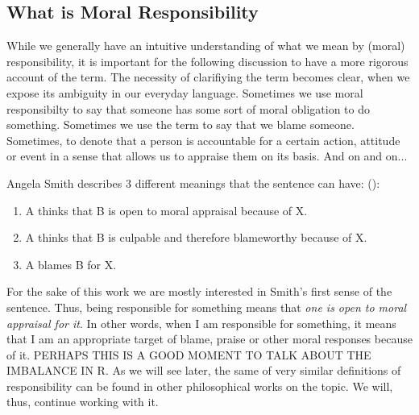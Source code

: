 \documentclass{article}
\begin{document}
\subsection{What is Moral Responsibility}

 While we generally have an intuitive understanding of what we mean
by (moral) responsibility, it is important for the following discussion to have
a more rigorous account of the term. The necessity of clarifiying the term
becomes clear, when we expose its ambiguity in our everyday language.
Sometimes we use moral responsibilty to say that someone has some sort of moral
obligation to do something. Sometimes we use the term to say that we blame
someone. Sometimes, to denote that a person is accountable for a certain action,
attitude or event in a sense that allows us to appraise them on its basis.  And on and on...

Angela Smith describes 3 different meanings that the sentence
 can have:
(\cite[p. 469]{Smith_2007}):

\begin{enumerate}
	\item A thinks that B is open to moral appraisal because of X.\\
	\item A thinks that B is culpable and therefore blameworthy because of
		X.\\
	\item A blames B for X.
\end{enumerate}

For the sake of this work we are mostly interested in Smith's first sense of the
sentence. Thus, being responsible for something means that \textit{one is open to moral
appraisal for it}. In other words, when I am responsible for something, it means
that I am an appropriate target of blame, praise or other moral responses
because of it. PERHAPS THIS IS A GOOD MOMENT TO TALK ABOUT THE IMBALANCE IN R.
As we will see later, the same of very similar definitions of
responsibility can be found in other philosophical works on the topic. We
will, thus, continue working with it.
\end{document}
